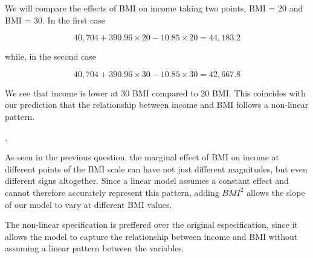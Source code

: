 We will compare the effects of BMI on income taking two points, BMI = 20 and BMI = 30. In the first case 

\vspace{-1em}

\begin{equation}
    40,704 + 390.96 \times 20 - 10.85 \times 20 = 44,183.2
\end{equation}

while, in the second case

\vspace{-1em}

\begin{equation}
    40,704 + 390.96 \times 30 - 10.85 \times 30 = 42,667.8
\end{equation}

We see that income is lower at 30 BMI compared to 20 BMI. This coincides with our prediction that the relationship between income and BMI follows a non-linear pattern.

,

As seen in the previous question, the marginal effect of BMI on income at different points of the BMI scale can have not just different magnitudes, but even different signs altogether. Since a linear model assumes a constant effect and cannot therefore accurately represent this pattern, adding $BMI^2$ allows the slope of our model to vary at different BMI values.


The non-linear specification is preffered over the original especification, since it allows the model to capture the relationship between income and BMI without assuming a linear pattern between the variables.
